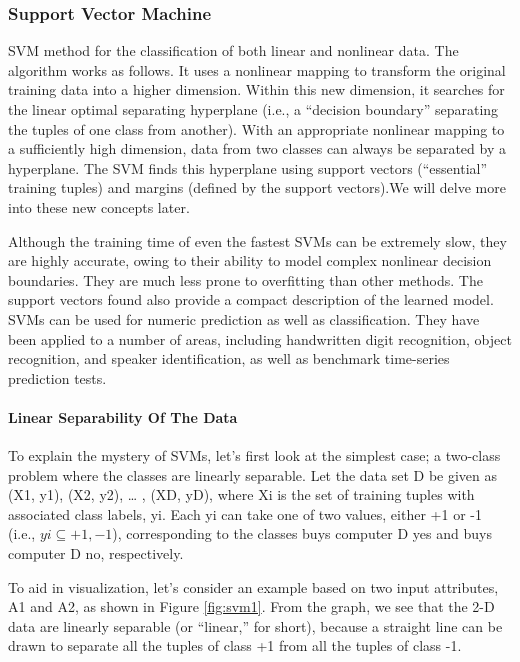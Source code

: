 \documentclass[12pt,fleqn]{book} %
\begin{document}
\subsubsection{Support Vector Machine}
SVM method for the classification of both linear and nonlinear data. The algorithm works as follows. It uses a nonlinear mapping to transform the original training data into a higher dimension. Within this new dimension, it searches for the linear optimal separating hyperplane (i.e., a “decision boundary” separating the tuples of one class from another). With an appropriate nonlinear mapping to a sufficiently high dimension, data from two classes can always be separated by a hyperplane. The SVM finds this hyperplane using support vectors (“essential” training tuples) and margins (defined by the support vectors).We will delve more into these new concepts later.


Although the training time of even the fastest SVMs can be extremely slow, they are highly accurate, owing to their ability to model complex nonlinear decision boundaries. They are much less prone to overfitting than other methods. The support vectors found also provide a compact description of the learned model. SVMs can be used for numeric prediction as well as classification. They have been applied to a number of areas, including handwritten digit recognition, object recognition, and speaker identification, as well as benchmark time-series prediction tests.
 \bigskip
\paragraph{Linear Separability Of The Data}
To explain the mystery of SVMs, let’s first look at the simplest case; a two-class problem where the classes are linearly separable. Let the data set D be given as (X1, y1),
(X2, y2), … , (XD, yD), where Xi is the set of training tuples with associated class labels, yi. Each yi can take one of two values, either +1 or -1 (i.e., $yi \subseteq{+1,-1}$), corresponding to the classes buys computer D yes and buys computer D no, respectively.\bigskip

To aid in visualization, let’s consider an example based on two input attributes, A1 and A2, as shown in Figure \ref{fig:svm1}. From the graph, we see that the 2-D data are linearly separable (or “linear,” for short), because a straight line can be drawn to separate all the tuples of class +1 from all the tuples of class -1.\bigskip
\end{document}

